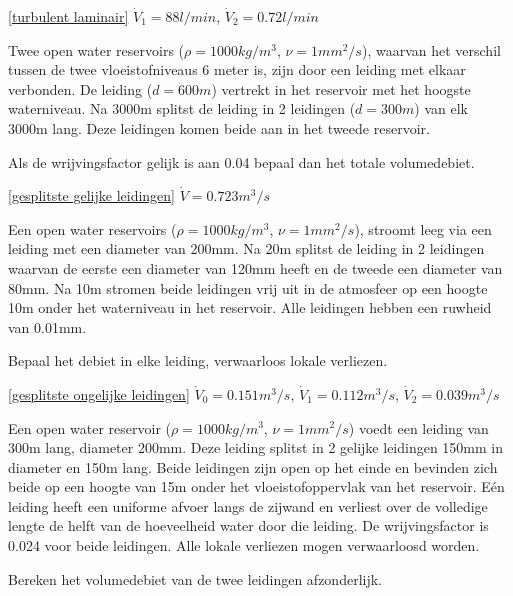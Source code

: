 \begin{antwoord}{\ref{turbulent laminair}}
	$\dot{V}_1 = 88\unit{l/min}$, $\dot{V}_2 = 0.72\unit{l/min}$
\end{antwoord}
\begin{toepassing}
	\label{gesplitste gelijke leidingen}
Twee open water reservoirs ($\rho=1000\unit{kg/m^3}$, $\nu=1\unit{mm^2/s}$), waarvan het verschil tussen de twee vloeistofniveaus 6 meter is, zijn door een leiding met elkaar verbonden. De leiding ($d=600\unit{m}$) vertrekt in het reservoir met het hoogste waterniveau. Na 3000m splitst de leiding in 2 leidingen ($d=300\unit{m}$) van elk 3000m lang. Deze leidingen komen beide aan in het tweede reservoir. 
		
Als de wrijvingsfactor gelijk is aan 0.04 bepaal dan het totale volumedebiet. 
\end{toepassing}
\begin{antwoord}{\ref{gesplitste gelijke leidingen}}
	$\dot{V} = 0.723\unit{m^3/s}$
\end{antwoord}
\begin{toepassing}[*]
	\label{gesplitste ongelijke leidingen}
Een open water reservoirs ($\rho=1000\unit{kg/m^3}$, $\nu=1\unit{mm^2/s}$), stroomt leeg via een leiding met een diameter van 200mm. Na 20m splitst de leiding in 2 leidingen waarvan de eerste een diameter van 120mm heeft en de tweede een diameter van 80mm. Na 10m stromen beide leidingen vrij uit in de atmosfeer op een hoogte 10m onder het waterniveau in het reservoir. Alle leidingen hebben een ruwheid van 0.01mm.

Bepaal het debiet in elke leiding, verwaarloos lokale verliezen.
\end{toepassing}
\begin{antwoord}{\ref{gesplitste ongelijke leidingen}}
	$\dot{V}_0 = 0.151\unit{m^3/s}$, $\dot{V}_1 = 0.112\unit{m^3/s}$, $\dot{V}_2 = 0.039\unit{m^3/s}$
\end{antwoord}
\begin{toepassing}[*]
	\label{geperforeerde leiding debiet}
Een open water reservoir ($\rho=1000\unit{kg/m^3}$, $\nu=1\unit{mm^2/s}$) voedt een leiding van 300m lang, diameter 200mm. Deze leiding splitst in 2 gelijke leidingen 150mm in diameter en 150m lang. Beide leidingen zijn open op het einde en bevinden zich beide op een hoogte van 15m onder het vloeistofoppervlak van het reservoir. Eén leiding heeft een uniforme afvoer langs de zijwand en verliest over de volledige lengte de helft van de hoeveelheid water door die leiding. De wrijvingsfactor is 0.024 voor beide leidingen. Alle lokale verliezen mogen verwaarloosd worden.
		
Bereken het volumedebiet van de twee leidingen afzonderlijk. 
\end{toepassing}
